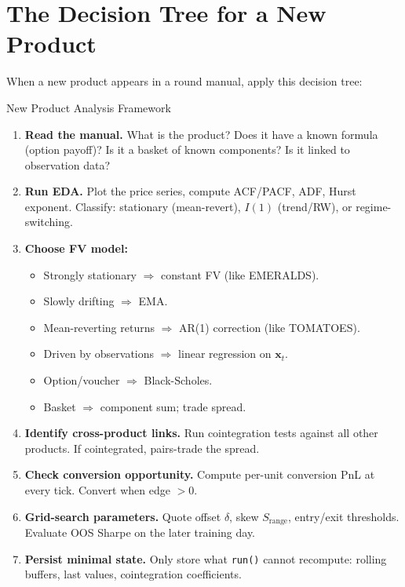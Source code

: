 \documentclass[12pt,a4paper,openany]{report}
\theoremstyle{definition}
\begin{document}
\section{The Decision Tree for a New Product}

When a new product appears in a round manual, apply this decision tree:

\begin{keyconceptbox}{New Product Analysis Framework}
\begin{enumerate}[label=\arabic*.]
  \item \textbf{Read the manual.} What is the product? Does it have a known formula (option payoff)? Is it a basket of known components? Is it linked to observation data?
  \item \textbf{Run EDA.} Plot the price series, compute ACF/PACF, ADF, Hurst exponent. Classify: stationary (mean-revert), $I(1)$ (trend/RW), or regime-switching.
  \item \textbf{Choose FV model:}
    \begin{itemize}
      \item Strongly stationary $\Rightarrow$ constant FV (like EMERALDS).
      \item Slowly drifting $\Rightarrow$ EMA.
      \item Mean-reverting returns $\Rightarrow$ AR(1) correction (like TOMATOES).
      \item Driven by observations $\Rightarrow$ linear regression on $\mathbf{x}_t$.
      \item Option/voucher $\Rightarrow$ Black-Scholes.
      \item Basket $\Rightarrow$ component sum; trade spread.
    \end{itemize}
  \item \textbf{Identify cross-product links.} Run cointegration tests against all other products. If cointegrated, pairs-trade the spread.
  \item \textbf{Check conversion opportunity.} Compute per-unit conversion PnL at every tick. Convert when edge $> 0$.
  \item \textbf{Grid-search parameters.} Quote offset $\delta$, skew $S_{\text{range}}$, entry/exit thresholds. Evaluate OOS Sharpe on the later training day.
  \item \textbf{Persist minimal state.} Only store what \texttt{run()} cannot recompute: rolling buffers, last values, cointegration coefficients.
\end{enumerate}
\end{keyconceptbox}
\end{document}
